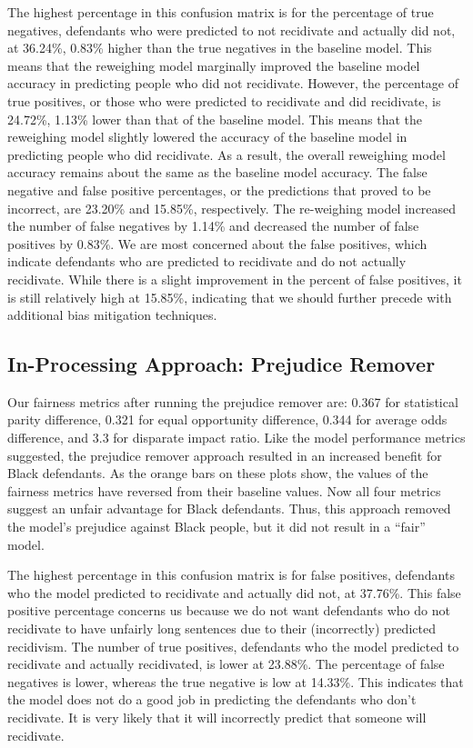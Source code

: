 \documentclass[water,article,submit,moreauthors,pdftex]{mdpi}
\begin{document}
The highest percentage in this confusion matrix is for the percentage of
true negatives, defendants who were predicted to not recidivate and
actually did not, at 36.24\%, 0.83\% higher than the true negatives in
the baseline model. This means that the reweighing model marginally
improved the baseline model accuracy in predicting people who did not
recidivate. However, the percentage of true positives, or those who were
predicted to recidivate and did recidivate, is 24.72\%, 1.13\% lower
than that of the baseline model. This means that the reweighing model
slightly lowered the accuracy of the baseline model in predicting people
who did recidivate. As a result, the overall reweighing model accuracy
remains about the same as the baseline model accuracy. The false
negative and false positive percentages, or the predictions that proved
to be incorrect, are 23.20\% and 15.85\%, respectively. The re-weighing
model increased the number of false negatives by 1.14\% and decreased
the number of false positives by 0.83\%. We are most concerned about the
false positives, which indicate defendants who are predicted to
recidivate and do not actually recidivate. While there is a slight
improvement in the percent of false positives, it is still relatively
high at 15.85\%, indicating that we should further precede with
additional bias mitigation techniques.

\hypertarget{in-processing-approach-prejudice-remover}{%
\subsection{In-Processing Approach: Prejudice
Remover}\label{in-processing-approach-prejudice-remover}}

Our fairness metrics after running the prejudice remover are: 0.367 for
statistical parity difference, 0.321 for equal opportunity difference,
0.344 for average odds difference, and 3.3 for disparate impact ratio.
Like the model performance metrics suggested, the prejudice remover
approach resulted in an increased benefit for Black defendants. As the
orange bars on these plots show, the values of the fairness metrics have
reversed from their baseline values. Now all four metrics suggest an
unfair advantage for Black defendants. Thus, this approach removed the
model's prejudice against Black people, but it did not result in a
``fair'' model.

The highest percentage in this confusion matrix is for false positives,
defendants who the model predicted to recidivate and actually did not,
at 37.76\%. This false positive percentage concerns us because we do not
want defendants who do not recidivate to have unfairly long sentences
due to their (incorrectly) predicted recidivism. The number of true
positives, defendants who the model predicted to recidivate and actually
recidivated, is lower at 23.88\%. The percentage of false negatives is
lower, whereas the true negative is low at 14.33\%. This indicates that
the model does not do a good job in predicting the defendants who don't
recidivate. It is very likely that it will incorrectly predict that
someone will recidivate.
\end{document}
